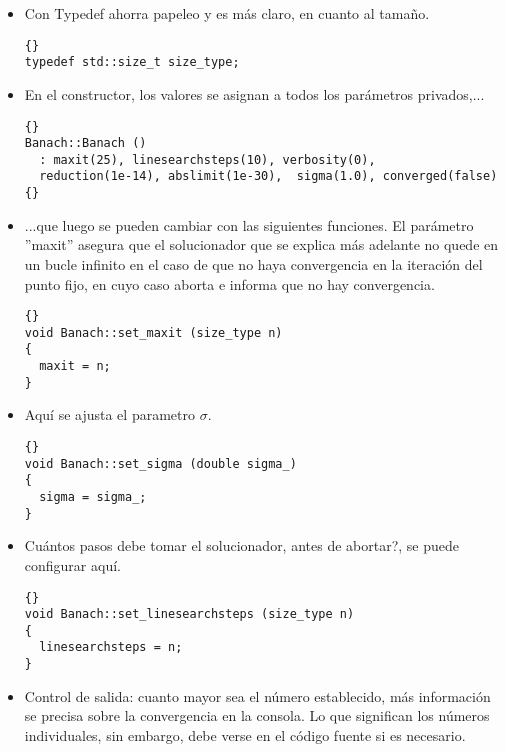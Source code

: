 \documentclass[a4paper,11pt]{article}
\theoremstyle{definition}
\begin{document}
\begin{itemize}
\item Con Typedef ahorra papeleo y es más claro, en cuanto al tamaño.

  {\footnotesize{\begin{lstlisting}{}
typedef std::size_t size_type;
\end{lstlisting}}}

\item En el constructor, los valores se asignan a todos los parámetros privados,...

{\footnotesize{\begin{lstlisting}{}
Banach::Banach ()
  : maxit(25), linesearchsteps(10), verbosity(0),
  reduction(1e-14), abslimit(1e-30),  sigma(1.0), converged(false)
{}
\end{lstlisting}}}

\item ...que luego se pueden cambiar con las siguientes funciones.  El parámetro ''maxit''  asegura que el solucionador que se explica más adelante no quede en un bucle infinito en el caso de que no haya convergencia en la iteración del punto fijo, en cuyo caso aborta e informa que no hay convergencia.

 {\footnotesize{\begin{lstlisting}{}
void Banach::set_maxit (size_type n)
{
  maxit = n;
}
\end{lstlisting}}}

\item Aquí se ajusta el parametro $\sigma$.

  {\footnotesize{\begin{lstlisting}{}
void Banach::set_sigma (double sigma_)
{
  sigma = sigma_;
}
\end{lstlisting}}}

\item Cuántos pasos debe tomar el solucionador, antes de abortar?, se puede configurar aquí.

{\footnotesize{\begin{lstlisting}{}
void Banach::set_linesearchsteps (size_type n)
{
  linesearchsteps = n;
}
\end{lstlisting}}}

\item Control de salida: cuanto mayor sea el número establecido, más información se precisa sobre la convergencia en la consola. Lo que significan los números individuales, sin embargo, debe verse en el código fuente si es necesario.


\end{itemize}
\end{document}
